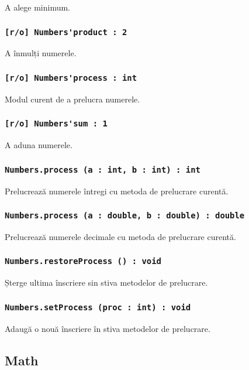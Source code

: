A alege minimum.

\subsubsection{\lstinline|[r/o] Numbers'product : 2|}

A înmulți numerele.

\subsubsection{\lstinline|[r/o] Numbers'process : int|}

Modul curent de a prelucra numerele.

\subsubsection{\lstinline|[r/o] Numbers'sum : 1|}

A aduna numerele.

\subsubsection{\lstinline|Numbers.process (a : int, b : int) : int|}

Prelucrează numerele întregi cu metoda de prelucrare curentă.

\subsubsection{\lstinline|Numbers.process (a : double, b : double) : double|}

Prelucrează numerele decimale cu metoda de prelucrare curentă.

\subsubsection{\lstinline|Numbers.restoreProcess () : void|}

Șterge ultima înscriere sin stiva metodelor de prelucrare.

\subsubsection{\lstinline|Numbers.setProcess (proc : int) : void|}

Adaugă o nouă înscriere în stiva metodelor de prelucrare.

\subsection{{\color{orange} Math}}

